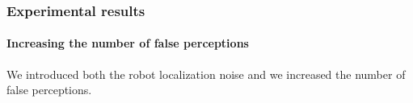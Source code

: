 \begin{frame}
	\frametitle{Experimental results}
	\framesubtitle{Increasing the number of false perceptions}
	
	\vspace{0.3cm}
	
	We introduced both the robot localization noise and we increased the number of false perceptions.
	
	\vspace{0.1cm}
	
	\begin{center}
	\end{center}
\end{frame}
